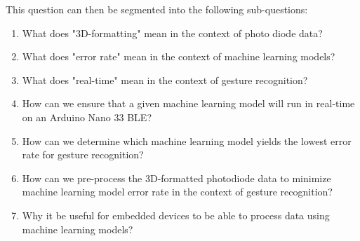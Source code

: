 This question can then be segmented into the following sub-questions:
\begin{enumerate}
    \item What does "3D-formatting" mean in the context of photo diode data?
    \item What does "error rate" mean in the context of machine learning models?
    \item What does "real-time" mean in the context of gesture recognition?
    \item How can we ensure that a given machine learning model will run in real-time on an Arduino Nano 33 BLE?
    \item How can we determine which machine learning model yields the lowest error rate for gesture recognition?
    \item How can we pre-process the 3D-formatted photodiode data to minimize machine learning model error rate in the context of gesture recognition?
    \item Why it be useful for embedded devices to be able to process data using machine learning models?
\end{enumerate}

